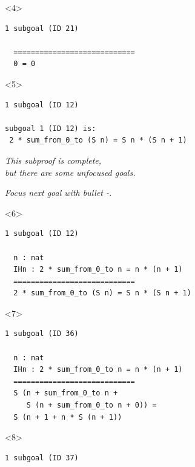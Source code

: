 \documentclass{beamer}
\begin{document}
\begin{frame}[fragile]
\begin{columns}
\begin{column}{0.7\textwidth}
    \begin{onlyenv}<4>
    \minipage[c][0.65\textheight][s]{\columnwidth}
    \begin{verbatim}
1 subgoal (ID 21)
  
  ============================
  0 = 0
    \end{verbatim}
    \endminipage
    \end{onlyenv}

    \begin{onlyenv}<5>
    \minipage[c][0.65\textheight][s]{\columnwidth}
    \begin{verbatim}
1 subgoal (ID 12)

subgoal 1 (ID 12) is:
 2 * sum_from_0_to (S n) = S n * (S n + 1)
    \end{verbatim}

    \vspace{5ex}

    \textit{This subproof is complete,}\\
    \hspace*{2em}\textit{but there are some unfocused goals.}

    \textit{Focus next goal with bullet -.}
    \endminipage
    \end{onlyenv}

    \begin{onlyenv}<6>
    \minipage[c][0.65\textheight][s]{\columnwidth}
    \begin{verbatim}
1 subgoal (ID 12)
  
  n : nat
  IHn : 2 * sum_from_0_to n = n * (n + 1)
  ============================
  2 * sum_from_0_to (S n) = S n * (S n + 1)
    \end{verbatim}
    \endminipage
    \end{onlyenv}

    \begin{onlyenv}<7>
    \minipage[c][0.65\textheight][s]{\columnwidth}
    \begin{verbatim}
1 subgoal (ID 36)
  
  n : nat
  IHn : 2 * sum_from_0_to n = n * (n + 1)
  ============================
  S (n + sum_from_0_to n +
     S (n + sum_from_0_to n + 0)) =
  S (n + 1 + n * S (n + 1))
    \end{verbatim}
    \endminipage
    \end{onlyenv}

    \begin{onlyenv}<8>
    \minipage[c][0.65\textheight][s]{\columnwidth}
    \begin{verbatim}
1 subgoal (ID 37)
  

\end{verbatim}
\end{onlyenv}
\end{column}
\end{columns}
\end{frame}
\end{document}
